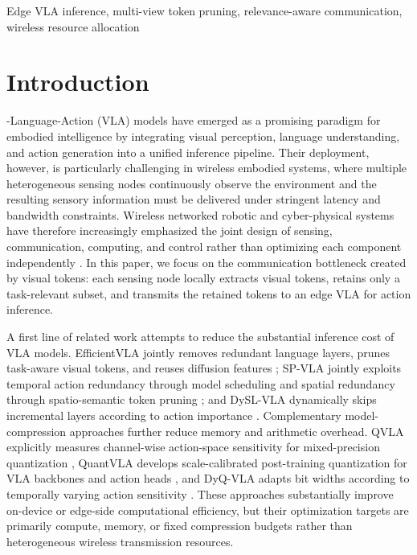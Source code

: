 \documentclass[lettersize,journal]{IEEEtran}
\theoremstyle{custom}
\begin{document}
\begin{IEEEkeywords}
Edge VLA inference, multi-view token pruning, relevance-aware communication, wireless resource allocation
\end{IEEEkeywords}

\section{Introduction}
-Language-Action (VLA) models have emerged as a promising paradigm for embodied intelligence by integrating visual perception, language understanding, and action generation into a unified inference pipeline. Their deployment, however, is particularly challenging in wireless embodied systems, where multiple heterogeneous sensing nodes continuously observe the environment and the resulting sensory information must be delivered under stringent latency and bandwidth constraints. Wireless networked robotic and cyber-physical systems have therefore increasingly emphasized the joint design of sensing, communication, computing, and control rather than optimizing each component independently \cite{fang2025sc3,pang2025codesign,diao2025taskoriented}. In this paper, we focus on the communication bottleneck created by visual tokens: each sensing node locally extracts visual tokens, retains only a task-relevant subset, and transmits the retained tokens to an edge VLA for action inference.

A first line of related work attempts to reduce the substantial inference cost of VLA models. EfficientVLA jointly removes redundant language layers, prunes task-aware visual tokens, and reuses diffusion features \cite{yang2025efficientvla}; SP-VLA jointly exploits temporal action redundancy through model scheduling and spatial redundancy through spatio-semantic token pruning \cite{li2025spvla}; and DySL-VLA dynamically skips incremental layers according to action importance \cite{yang2026dyslvla}. Complementary model-compression approaches further reduce memory and arithmetic overhead. QVLA explicitly measures channel-wise action-space sensitivity for mixed-precision quantization \cite{xu2026qvla}, QuantVLA develops scale-calibrated post-training quantization for VLA backbones and action heads \cite{zhang2026quantvla}, and DyQ-VLA adapts bit widths according to temporally varying action sensitivity \cite{zheng2026dyqvla}. These approaches substantially improve on-device or edge-side computational efficiency, but their optimization targets are primarily compute, memory, or fixed compression budgets rather than heterogeneous wireless transmission resources.
\end{document}
